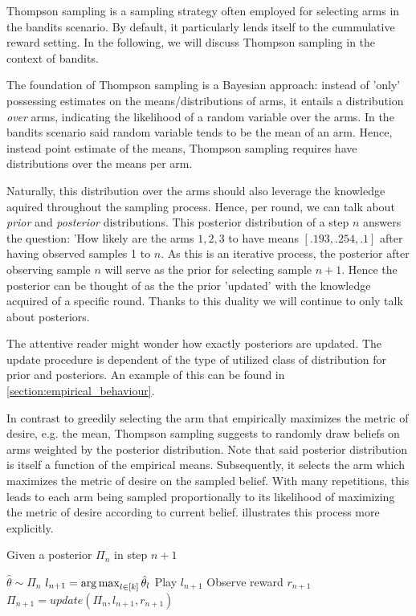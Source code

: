 Thompson sampling is a sampling strategy often employed for selecting arms in the bandits scenario. By default, it particularly lends itself to the cummulative reward setting. In the following, we will discuss Thompson sampling in the context of bandits.

The foundation of Thompson sampling is a Bayesian approach: instead of 'only' possessing estimates on the means/distributions of arms, it entails a distribution \emph{over} arms, indicating the likelihood of a random variable over the arms. In the bandits scenario said random variable tends to be the mean of an arm. Hence, instead point estimate of the means, Thompson sampling requires have distributions over the means per arm.

Naturally, this distribution over the arms should also leverage the knowledge aquired throughout the sampling process. Hence, per round, we can talk about \emph{prior} and \emph{posterior} distributions. This posterior distribution of a step $n$ answers the question: 'How likely are the arms $1, 2, 3$ to have means $[.193, .254, .1]$ after having observed samples 1 to $n$. As this is an iterative process, the posterior after observing sample $n$ will serve as the prior for selecting sample $n+1$. Hence the posterior can be thought of as the the prior 'updated' with the knowledge acquired of a specific round. Thanks to this duality we will continue to only talk about posteriors.

The attentive reader might wonder how exactly posteriors are updated. The update procedure is dependent of the type of utilized class of distribution for prior and posteriors. An example of this can be found in \ref{section:empirical_behaviour}.

In contrast to greedily selecting the arm that empirically maximizes the metric of desire, e.g. the mean, Thompson sampling suggests to randomly draw beliefs on arms weighted by the posterior distribution. Note that said posterior distribution is itself a function of the empirical means. Subsequently, it selects the arm which maximizes the metric of desire on the sampled belief. With many repetitions, this leads to each arm being sampled proportionally to its likelihood of maximizing the metric of desire according to current belief.  illustrates this process more explicitly.

\begin{algorithm}[H]
    \caption{Given a posterior $\Pi_n$ in step $n+1$}
    \label{alg:thompson_sampling}
  \begin{algorithmic}
    \State $\hat{\theta} \sim \Pi_n$
    \State $l_{n+1} = \operatorname*{arg\,max}_{l \in [k]}\hat{\theta}_l$
    \State Play $l_{n+1}$
    \State Observe reward $r_{n+1}$
    \State $\Pi_{n + 1} = update(\Pi_n, l_{n+1}, r_{n+1})$
  \end{algorithmic}
\end{algorithm}

